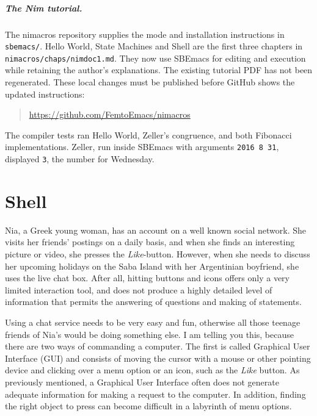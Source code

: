 \documentclass[a4paper,12pt,openany]{book}
\begin{document}
\paragraph{The Nim tutorial.}
The nimacros repository supplies the mode and installation instructions
in \verb|sbemacs/|. Hello World, State Machines and Shell are the first
three chapters in \verb|nimacros/chaps/nimdoc1.md|. They now use SBEmacs
for editing and execution while retaining the author's explanations.
The existing tutorial PDF has not been regenerated. These local changes
must be published before GitHub shows the updated instructions:
\begin{quote}
\url{https://github.com/FemtoEmacs/nimacros}
\end{quote}
The compiler tests ran Hello World, Zeller's congruence, and both
Fibonacci implementations. Zeller, run inside SBEmacs with arguments
\verb|2016 8 31|, displayed \verb|3|, the number for Wednesday.

\chapter{Shell}\label{chapter:shell}
Nia, a Greek young woman, has an
account on a well known social network.
She visits her friends' postings on a daily basis,
and when she finds an interesting picture or video,
she presses the {\em Like}-button. However, when
she needs to discuss her upcoming holidays on the Saba Island
with her Argentinian boyfriend, she uses the
live chat box. After all, hitting buttons and
icons offers only a very limited interaction tool,
and does not produce a highly detailed
level of information that permits the answering
of questions and making of statements.


Using a chat service needs to
be very easy and fun, otherwise all those teenage
friends of Nia's would be doing something else.
I am telling you this, because there are
two ways of commanding a computer.
The first is called Graphical User Interface (GUI)
and consists of moving the cursor with a
mouse or other pointing device and clicking
over a menu option or an icon,
such as the {\em Like} button.
As previously mentioned, a Graphical User Interface
often does not generate adequate information
for making a request to the computer. In addition,
finding the right object  to press
can become difficult in a labyrinth of
menu options.
\end{document}
